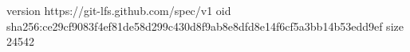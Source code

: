version https://git-lfs.github.com/spec/v1
oid sha256:ce29cf9083f4ef81de58d299c430d8f9ab8e8dfd8e14f6cf5a3bb14b53edd9ef
size 24542
